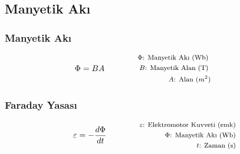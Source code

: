 \subsection{Manyetik Akı}

\subsubsection*{Manyetik Akı}
\begin{equation}
    \Phi = B A \qquad \qquad \parbox{4cm}{\footnotesize$\begin{aligned}
        \Phi\text{: Manyetik Akı (Wb) } \\
        B\text{: Manyetik Alan (T) } \\
        A\text{: Alan } (m^2)
\end{aligned}$}
\end{equation}

\subsubsection*{Faraday Yasası}
\begin{equation}
    \varepsilon = - \frac{d\Phi}{dt} \qquad \qquad \parbox{4cm}{\footnotesize$\begin{aligned}
        \varepsilon\text{: Elektromotor Kuvveti (emk) } \\
        \Phi\text{: Manyetik Akı (Wb) } \\
        t\text{: Zaman (s) }
\end{aligned}$}
\end{equation}
